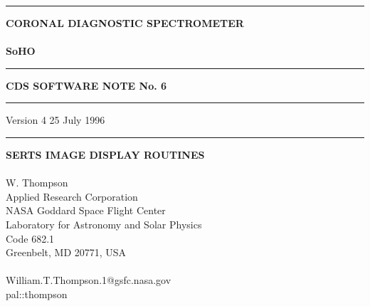 
\setlength{\oddsidemargin}{0in}		%
\setlength{\topmargin}{-0.5in}		%
\setlength{\textwidth}{6.5in}		%
\setlength{\textheight}{9in}		%

\addtolength{\parskip}{0.5\baselineskip}


\newenvironment{centerpage}{\mbox{} \protect\vspace*{\fill}}{
	\protect\vspace*{\fill} \mbox{} \protect\\ \mbox{}}

		

\begin{titlepage}
\hrule
{\noindent\bf CORONAL DIAGNOSTIC SPECTROMETER}\\
\vspace{-0.7\baselineskip}\\
{\noindent\Huge\bf SoHO}
\vspace{2mm}
\hrule
\vspace{3mm}
\centerline{\bf CDS SOFTWARE NOTE No. 6}
\vspace{3mm}
\hrule
\noindent Version 4 \hfill 25 July 1996
\vspace{2mm}
\hrule

\begin{centerpage}

\begin{center}
{\Large\bf SERTS IMAGE DISPLAY ROUTINES}\\
\mbox{}\\
W. Thompson\\
Applied Research Corporation\\
NASA Goddard Space Flight Center\\
Laboratory for Astronomy and Solar Physics\\
Code 682.1\\
Greenbelt, MD 20771, USA\\
\mbox{}\\
William.T.Thompson.1@gsfc.nasa.gov\\
pal::thompson
\end{center}

\end{centerpage}

\end{titlepage}

